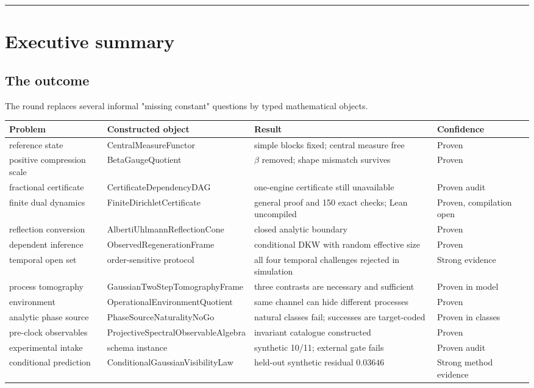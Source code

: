 \documentclass[11pt,a4paper,openany]{report}
\begin{document}
\par\medskip\hrule\medskip

\chapter{Executive summary}

\section{The outcome}

The round replaces several informal "missing constant" questions by typed mathematical objects.

\begin{center}
\begingroup\small
\setlength{\tabcolsep}{3.5pt}
\renewcommand{\arraystretch}{1.16}
\begin{longtable}{@{}p{}p{}p{}p{}@{}}
\toprule
\textbf{Problem} & \textbf{Constructed object} & \textbf{Result} & \textbf{Confidence} \\
\midrule
\endhead
reference state & CentralMeasureFunctor & simple blocks fixed; central measure free & Proven \\
positive compression scale & BetaGaugeQuotient & \(\beta\) removed; shape mismatch survives & Proven \\
fractional certificate & CertificateDependencyDAG & one-engine certificate still unavailable & Proven audit \\
finite dual dynamics & FiniteDirichletCertificate & general proof and 150 exact checks; Lean uncompiled & Proven, compilation open \\
reflection conversion & AlbertiUhlmannReflectionCone & closed analytic boundary & Proven \\
dependent inference & ObservedRegenerationFrame & conditional DKW with random effective size & Proven \\
temporal open set & order-sensitive protocol & all four temporal challenges rejected in simulation & Strong evidence \\
process tomography & GaussianTwoStepTomographyFrame & three contrasts are necessary and sufficient & Proven in model \\
environment & OperationalEnvironmentQuotient & same channel can hide different processes & Proven \\
analytic phase source & PhaseSourceNaturalityNoGo & natural classes fail; successes are target-coded & Proven in classes \\
pre-clock observables & ProjectiveSpectralObservableAlgebra & invariant catalogue constructed & Proven \\
experimental intake & schema instance & synthetic 10/\allowbreak{}11; external gate fails & Proven audit \\
conditional prediction & ConditionalGaussianVisibilityLaw & held-out synthetic residual \(0.03646\) & Strong method evidence \\
\bottomrule
\end{longtable}
\endgroup
\end{center}
\end{document}
